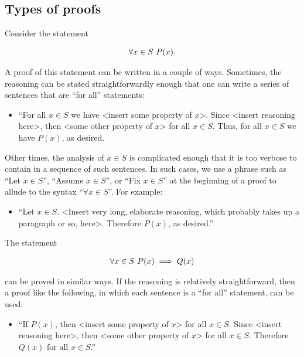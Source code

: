 \subsection*{Types of proofs}

Consider the statement

\begin{align*}
    \forall x \in S \text{ } P(x).
\end{align*}

A proof of this statement can be written in a couple of ways. Sometimes, the reasoning can be stated straightforwardly enough that one can write a series of sentences that are ``for all'' statements:

\begin{itemize}
    \item ``For all $x \in S$ we have <insert some property of $x$>. Since <insert reasoning here>, then <some other property of $x$> for all $x \in S$. Thus, for all $x \in S$ we have $P(x)$, as desired.
\end{itemize}

Other times, the analysis of $x \in S$ is complicated enough that it is too verbose to contain in a sequence of such sentences. In such cases, we use a phrase such as ``Let $x \in S$'', ``Assume $x \in S$'', or ``Fix $x \in S$'' at the beginning of a proof to allude to the syntax ``$\forall x \in S$''. For example:

\begin{itemize}
    \item ``Let $x \in S$. <Insert very long, elaborate reasoning, which probably takes up a paragraph or so, here>. Therefore $P(x)$, as desired.''
\end{itemize}

The statement

\begin{align*}
    \forall x \in S \text{ } P(x) \implies Q(x)
\end{align*}

can be proved in similar ways. If the reasoning is relatively straightforward, then a proof like the following, in which each sentence is a ``for all'' statement, can be used:

\begin{itemize}
    \item ``If $P(x)$, then <insert some property of $x$> for all $x \in S$. Since <insert reasoning here>, then <some other property of $x$> for all $x \in S$. Therefore $Q(x)$ for all $x \in S$.''
\end{itemize}


